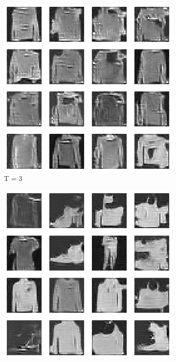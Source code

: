 \documentclass{article}
\begin{document}
\begin{figure}[H]
	\begin{subfigure}[h]{0.3\linewidth}
		\centering
		\includegraphics[scale=0.3]{../code/figures/generated_DDGAN_h2_3.png}
		\caption{T = 3}
	\end{subfigure}
	\hfill
	\begin{subfigure}[h]{0.3\linewidth}
		\centering
		\includegraphics[scale=0.3]{../code/figures/generated_DDGAN_h2_5.png}

\end{subfigure}
\end{figure}
\end{document}
